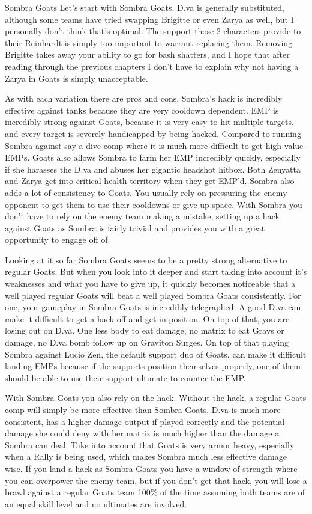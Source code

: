 Sombra Goats
Let’s start with Sombra Goats. D.va is generally substituted, although some teams have tried swapping Brigitte or even Zarya as well, but I personally don’t think that’s optimal. The support those 2 characters provide to their Reinhardt is simply too important to warrant replacing them. Removing Brigitte takes away your ability to go for bash shatters, and I hope that after reading through the previous chapters I don’t have to explain why not having a Zarya in Goats is simply unacceptable. 

As with each variation there are pros and cons. Sombra’s hack is incredibly effective against tanks because they are very cooldown dependent. EMP is incredibly strong against Goats, because it is very easy to hit multiple targets, and every target is severely handicapped by being hacked. Compared to running Sombra against say a dive comp where it is much more difficult to get high value EMPs. Goats also allows Sombra to farm her EMP incredibly quickly, especially if she harasses the D.va and abuses her gigantic headshot hitbox. Both Zenyatta and Zarya get into critical health territory when they get EMP’d. Sombra also adds a lot of consistency to Goats. You usually rely on pressuring the enemy opponent to get them to use their cooldowns or give up space. With Sombra you don’t have to rely on the enemy team making a mistake, setting up a hack against Goats as Sombra is fairly trivial and provides you with a great opportunity to engage off of. 

Looking at it so far Sombra Goats seems to be a pretty strong alternative to regular Goats. But when you look into it deeper and start taking into account it’s weaknesses and what you have to give up, it quickly becomes noticeable that a well played regular Goats will beat a well played Sombra Goats consistently. For one, your gameplay in Sombra Goats is incredibly telegraphed. A good D.va can make it difficult to get a hack off and get in position. On top of that, you are losing out on D.va. One less body to eat damage, no matrix to eat Gravs or damage, no D.va bomb follow up on Graviton Surges. On top of that playing Sombra against Lucio Zen, the default support duo of Goats, can make it difficult landing EMPs because if the supports position themselves properly, one of them should be able to use their support ultimate to counter the EMP. 

With Sombra Goats you also rely on the hack. Without the hack, a regular Goats comp will simply be more effective than Sombra Goats, D.va is much more consistent, has a higher damage output if played correctly and the potential damage she could deny with her matrix is much higher than the damage a Sombra can deal.
Take into account that Goats is very armor heavy, especially when a Rally is being used, which makes Sombra much less effective damage wise. If you land a hack as Sombra Goats you have a window of strength where you can overpower the enemy team, but if you don’t get that hack, you will lose a brawl against a regular Goats team 100\% of the time assuming both teams are of an equal skill level and no ultimates are involved.

